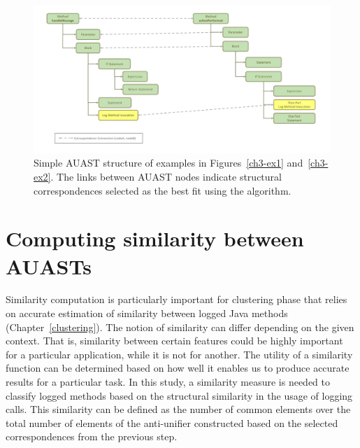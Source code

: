 \begin{figure} [H]
  \centering\includegraphics [width = \textwidth]{Drawing4/FinalCorr.pdf}
  \caption{Simple AUAST structure of examples in Figures~\ref{ch3-ex1} and~\ref{ch3-ex2}. The links between AUAST nodes indicate structural correspondences selected as the best fit using the  algorithm.}
  \label{fig:AUASTs}
\end{figure}

\section{Computing similarity between AUASTs} \label{meth-similarity}
Similarity computation is particularly important for clustering phase that relies on accurate estimation of similarity between logged Java methods (Chapter~\ref{clustering}). The notion of similarity can differ depending on the given context. That is, similarity between certain features could be highly important for a particular application, while it is not for another. The utility of a similarity function can be determined based on how well it enables us to produce accurate results for a particular task. In this study, a similarity measure is needed to classify logged methods based on the structural similarity in the usage of logging calls. This similarity can be defined as the number of common elements over the total number of elements of the anti-unifier constructed based on the selected correspondences from the previous step.

